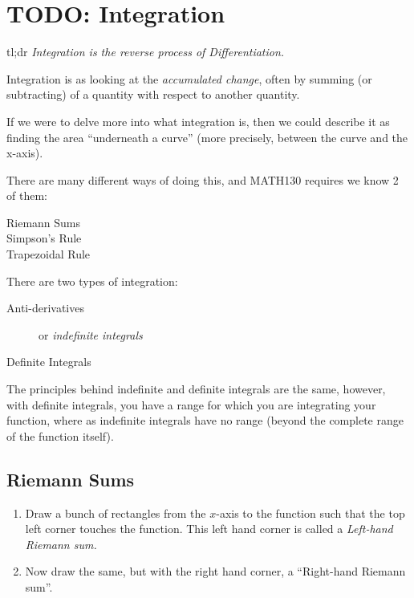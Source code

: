 \chapter{TODO: Integration}
\label{sec:Integration}
tl;dr \emph{Integration is the reverse process of Differentiation.}

Integration is as looking at the \emph{accumulated change}, often by summing (or
subtracting) of a quantity with respect to another quantity.

If we were to delve more into what integration is, then we could describe it as
finding the area ``underneath a curve'' (more precisely, between the curve and
the x-axis).

There are many different ways of doing this, and MATH130 requires we know 2 of
them:
\begin{description}
  \item[Riemann Sums]
  \item[Simpson's Rule]
  \item[Trapezoidal Rule]
\end{description}

There are two types of integration:
\begin{description}
  \item[Anti-derivatives] or \emph{indefinite integrals}
  \item[Definite Integrals]
\end{description}
The principles behind indefinite and definite integrals are the same, however,
with definite integrals, you have a range for which you are integrating your
function, where as indefinite integrals have no range (beyond the complete range
of the function itself).

\section{Riemann Sums}
\begin{enumerate}
  \item Draw a bunch of rectangles from the $x$-axis to the function
such that the top left corner touches the function. This left hand corner is called a
\emph{Left-hand Riemann sum.}

  \item Now draw the same, but with the right hand corner, a ``Right-hand
 Riemann sum''.
\end{enumerate}

